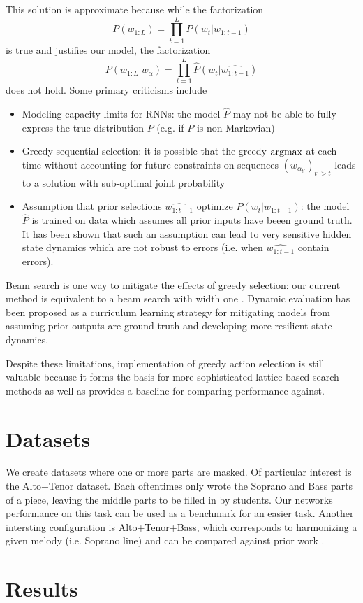 \documentclass[dissertation.tex]{subfiles}
\begin{document}
This solution is approximate because while the factorization
\begin{equation}
  P(w_{1:L}) = \prod_{t=1}^L P(w_t | w_{1:t-1})
\end{equation}
is true and justifies our model, the factorization
\begin{equation}
  P(w_{1:L} | w_{\alpha}) = \prod_{t=1}^L \hat{P}(w_t | \hat{w_{1:t-1}} )
\end{equation}
does not hold. Some primary criticisms include
\begin{itemize}
  \item Modeling capacity limits for RNNs: the model $\hat{P}$ may not be able to fully express
    the true distribution $P$ (e.g. if $P$ is non-Markovian)
  \item Greedy sequential selection: it is possible that the greedy $\operatorname*{argmax}$ at each
    time without accounting for future constraints on sequences $(w_{\alpha_{t'}})_{t' > t}$
    leads to a solution with sub-optimal joint probability
  \item Assumption that prior selections $\hat{w_{1:t-1}}$ optimize $P(w_t | w_{1:t-1})$:
    the model $\hat{P}$ is trained on data which assumes all prior inputs have beeen
    ground truth. It has been shown  that such an assumption can lead to
    very sensitive hidden state dynamics which are not robust to errors (i.e. when
    $\hat{w_{1:t-1}}$ contain errors).
\end{itemize}
Beam search is one way to mitigate the effects of greedy selection: our current method
is equivalent to a beam search with width one .
Dynamic evaluation  has been proposed as a curriculum learning strategy for
mitigating models from assuming prior outputs are ground truth and developing more resilient
state dynamics.

Despite these limitations, implementation of greedy action selection is still valuable
because it forms the basis for more sophisticated lattice-based search methods as well as
provides a baseline for comparing performance against.

\section{Datasets}

We create datasets where one or more parts are masked. Of particular interest is the
Alto+Tenor dataset. Bach oftentimes only wrote the Soprano and Bass parts of a piece,
leaving the middle parts to be filled in by students. Our networks performance on this task
can be used as a benchmark for an easier task. Another intersting configuration is Alto+Tenor+Bass,
which corresponds to harmonizing a given melody (i.e. Soprano line) and can be compared
against prior work .

\section{Results}

\printbibliography
\end{document}
